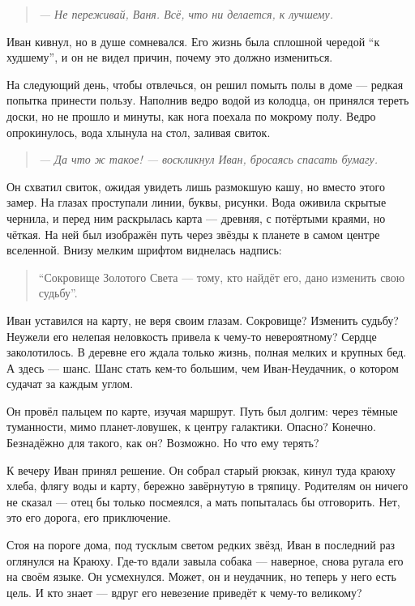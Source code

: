\documentclass[12pt,a4paper]{book}
\newenvironment{dialogue}{\begin{quote}\itshape}{\end{quote}} %
\begin{document}
\begin{dialogue}
--- Не переживай, Ваня. Всё, что ни делается, к лучшему.
\end{dialogue}

Иван кивнул, но в душе сомневался. Его жизнь была сплошной чередой ``к худшему'', и он не видел причин, почему это должно измениться.

На следующий день, чтобы отвлечься, он решил помыть полы в доме --- редкая попытка принести пользу. Наполнив ведро водой из колодца, он принялся тереть доски, но не прошло и минуты, как нога поехала по мокрому полу. Ведро опрокинулось, вода хлынула на стол, заливая свиток.

\begin{dialogue}
--- Да что ж такое! --- воскликнул Иван, бросаясь спасать бумагу.
\end{dialogue}

Он схватил свиток, ожидая увидеть лишь размокшую кашу, но вместо этого замер. На глазах проступали линии, буквы, рисунки. Вода оживила скрытые чернила, и перед ним раскрылась карта --- древняя, с потёртыми краями, но чёткая. На ней был изображён путь через звёзды к планете в самом центре вселенной. Внизу мелким шрифтом виднелась надпись:

\begin{quote}
``Сокровище Золотого Света --- тому, кто найдёт его, дано изменить свою судьбу''.
\end{quote}

Иван уставился на карту, не веря своим глазам. Сокровище? Изменить судьбу? Неужели его нелепая неловкость привела к чему-то невероятному? Сердце заколотилось. В деревне его ждала только жизнь, полная мелких и крупных бед. А здесь --- шанс. Шанс стать кем-то большим, чем Иван-Неудачник, о котором судачат за каждым углом.

Он провёл пальцем по карте, изучая маршрут. Путь был долгим: через тёмные туманности, мимо планет-ловушек, к центру галактики. Опасно? Конечно. Безнадёжно для такого, как он? Возможно. Но что ему терять?

К вечеру Иван принял решение. Он собрал старый рюкзак, кинул туда краюху хлеба, флягу воды и карту, бережно завёрнутую в тряпицу. Родителям он ничего не сказал --- отец бы только посмеялся, а мать попыталась бы отговорить. Нет, это его дорога, его приключение.

Стоя на пороге дома, под тусклым светом редких звёзд, Иван в последний раз оглянулся на Краюху. Где-то вдали завыла собака --- наверное, снова ругала его на своём языке. Он усмехнулся. Может, он и неудачник, но теперь у него есть цель. И кто знает --- вдруг его невезение приведёт к чему-то великому?
\end{document}
